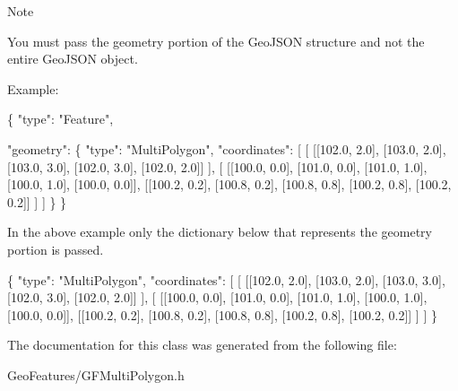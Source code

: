 \begin{DoxyNote}{Note}


You must pass the geometry portion of the Geo\+J\+S\+O\+N structure and not the entire Geo\+J\+S\+O\+N object.

Example\+:


\begin{DoxyCode}
\{
      \textcolor{stringliteral}{"type"}: \textcolor{stringliteral}{"Feature"},

      \textcolor{stringliteral}{"geometry"}: \{
                      \textcolor{stringliteral}{"type"}: \textcolor{stringliteral}{"MultiPolygon"},
                      \textcolor{stringliteral}{"coordinates"}: [
                           [
                              [[102.0, 2.0], [103.0, 2.0], [103.0, 3.0], [102.0, 3.0], [102.0, 2.0]]
                           ],
                           [
                              [[100.0, 0.0], [101.0, 0.0], [101.0, 1.0], [100.0, 1.0], [100.0, 0.0]],
                              [[100.2, 0.2], [100.8, 0.2], [100.8, 0.8], [100.2, 0.8], [100.2, 0.2]]
                           ]
                      ]
                  \}
 \}
\end{DoxyCode}


In the above example only the dictionary below that represents the geometry portion is passed.


\begin{DoxyCode}
 \{
     \textcolor{stringliteral}{"type"}: \textcolor{stringliteral}{"MultiPolygon"},
     \textcolor{stringliteral}{"coordinates"}: [
          [
            [[102.0, 2.0], [103.0, 2.0], [103.0, 3.0], [102.0, 3.0], [102.0, 2.0]]
          ],
          [
            [[100.0, 0.0], [101.0, 0.0], [101.0, 1.0], [100.0, 1.0], [100.0, 0.0]],
            [[100.2, 0.2], [100.8, 0.2], [100.8, 0.8], [100.2, 0.8], [100.2, 0.2]]
          ]
       ]
\}
\end{DoxyCode}
 
\end{DoxyNote}


The documentation for this class was generated from the following file\+:\begin{DoxyCompactItemize}
\item 
Geo\+Features/G\+F\+Multi\+Polygon.\+h\end{DoxyCompactItemize}
